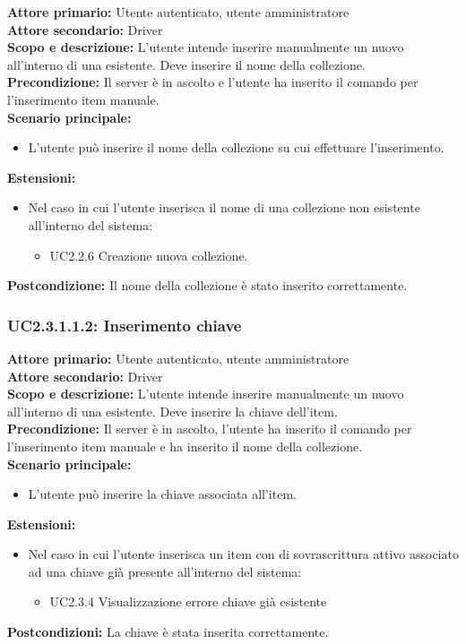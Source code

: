\documentclass{scalatekids-article}
\begin{document}
\textbf{Attore primario:} Utente autenticato, utente amministratore\\
\textbf{Attore secondario:} Driver\\
\textbf{Scopo e descrizione:} L'utente intende inserire manualmente un nuovo  all'interno di una  esistente. Deve inserire il nome della collezione.\\
\textbf{Precondizione:} Il server è in ascolto e l'utente ha inserito il comando per l'inserimento item manuale.\\
\textbf{Scenario principale:}
\begin{itemize}
\item L'utente può inserire il nome della collezione su cui effettuare l'inserimento.
\end{itemize}
\textbf{Estensioni:}
\begin{itemize}
\item Nel caso in cui l'utente inserisca il nome di una collezione non esistente all'interno del sistema:
  \begin{itemize}
  \item UC2.2.6 Creazione nuova collezione.
  \end{itemize}
\end{itemize}
\textbf{Postcondizione:} Il nome della collezione è stato inserito correttamente.

\subsubsection{UC2.3.1.1.2: Inserimento chiave}

\textbf{Attore primario:} Utente autenticato, utente amministratore\\
\textbf{Attore secondario:} Driver\\
\textbf{Scopo e descrizione:} L'utente intende inserire manualmente un nuovo  all'interno di una  esistente. Deve inserire la chiave dell'item.\\
\textbf{Precondizione:} Il server è in ascolto, l'utente ha inserito il comando per l'inserimento item manuale e ha inserito il nome della collezione.\\
\textbf{Scenario principale:}
\begin{itemize}
\item L'utente può inserire la chiave associata all'item.
\end{itemize}
\textbf{Estensioni:}
\begin{itemize}
\item Nel caso in cui l'utente inserisca un item con  di sovrascrittura attivo associato ad una chiave già presente all'interno del sistema:
  \begin{itemize}
  \item UC2.3.4 Visualizzazione errore chiave già esistente
  \end{itemize}
\end{itemize}
\textbf{Postcondizioni:} La chiave è stata inserita correttamente.
\end{document}
